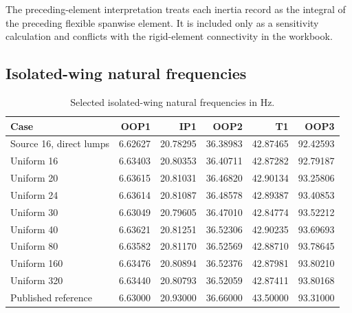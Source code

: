 \documentclass[11pt,a4paper]{article}
\begin{document}
\begin{table}[htbp]
\centering
\caption{Comparison of three interpretations on a 30-element uniform mesh.}
\end{table}

The preceding-element interpretation treats each inertia record as the
integral of the preceding flexible spanwise element.  It is included only as
a sensitivity calculation and conflicts with the rigid-element connectivity
in the workbook.

\subsection{Isolated-wing natural frequencies}

\begin{table}[htbp]
\centering
\caption{Selected isolated-wing natural frequencies in Hz.}
\begin{tabular}{lrrrrr}
\toprule
Case & OOP1 & IP1 & OOP2 & T1 & OOP3\\
\midrule
Source 16, direct lumps & 6.62627 & 20.78295 & 36.38983 & 42.87465 & 92.42593\\
Uniform 16 & 6.63403 & 20.80353 & 36.40711 & 42.87282 & 92.79187\\
Uniform 20 & 6.63615 & 20.81031 & 36.46820 & 42.90134 & 93.25806\\
Uniform 24 & 6.63614 & 20.81087 & 36.48578 & 42.89387 & 93.40853\\
Uniform 30 & 6.63049 & 20.79605 & 36.47010 & 42.84774 & 93.52212\\
Uniform 40 & 6.63621 & 20.81251 & 36.52306 & 42.90235 & 93.69693\\
Uniform 80 & 6.63582 & 20.81170 & 36.52569 & 42.88710 & 93.78645\\
Uniform 160 & 6.63476 & 20.80894 & 36.52376 & 42.87981 & 93.80210\\
Uniform 320 & 6.63440 & 20.80793 & 36.52059 & 42.87411 & 93.80168\\
Published reference & 6.63000 & 20.93000 & 36.66000 & 43.50000 & 93.31000\\
\bottomrule
\end{tabular}
\end{table}
\end{document}
